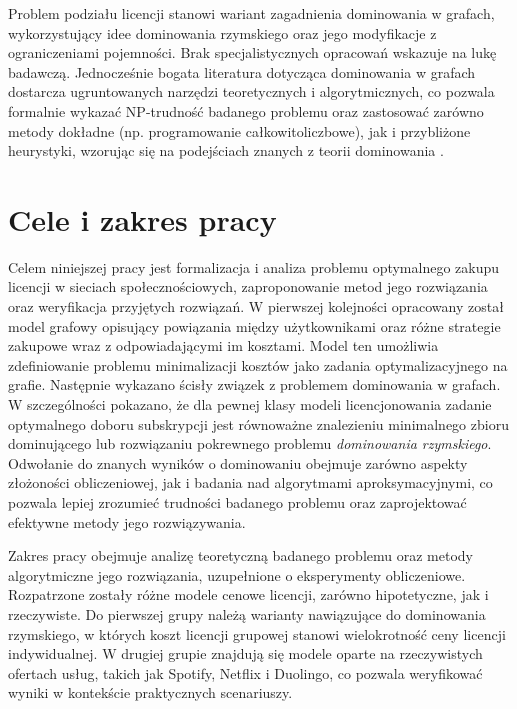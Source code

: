 Problem podziału licencji stanowi wariant zagadnienia dominowania w grafach, wykorzystujący idee dominowania rzymskiego oraz jego modyfikacje z ograniczeniami pojemności. Brak specjalistycznych opracowań wskazuje na lukę badawczą. Jednocześnie bogata literatura dotycząca dominowania w grafach dostarcza ugruntowanych narzędzi teoretycznych i algorytmicznych, co pozwala formalnie wykazać NP-trudność badanego problemu oraz zastosować zarówno metody dokładne (np. programowanie całkowitoliczbowe), jak i przybliżone heurystyki, wzorując się na podejściach znanych z teorii dominowania \cite{Roman2DominationSurvey, CapDom}.


\section{Cele i zakres pracy}
Celem niniejszej pracy jest formalizacja i analiza problemu optymalnego zakupu licencji w sieciach społecznościowych, zaproponowanie metod jego rozwiązania oraz weryfikacja przyjętych rozwiązań. W pierwszej kolejności opracowany został model grafowy opisujący powiązania między użytkownikami oraz różne strategie zakupowe wraz z odpowiadającymi im kosztami. Model ten umożliwia zdefiniowanie problemu minimalizacji kosztów jako zadania optymalizacyjnego na grafie. Następnie wykazano ścisły związek z problemem dominowania w grafach. W szczególności pokazano, że dla pewnej klasy modeli licencjonowania zadanie optymalnego doboru subskrypcji jest równoważne znalezieniu minimalnego zbioru dominującego lub rozwiązaniu pokrewnego problemu \emph{dominowania rzymskiego}. Odwołanie do znanych wyników o dominowaniu obejmuje zarówno aspekty złożoności obliczeniowej, jak i badania nad algorytmami aproksymacyjnymi, co pozwala lepiej zrozumieć trudności badanego problemu oraz zaprojektować efektywne metody jego rozwiązywania.

Zakres pracy obejmuje analizę teoretyczną badanego problemu oraz metody algorytmiczne jego rozwiązania, uzupełnione o eksperymenty obliczeniowe. Rozpatrzone zostały różne modele cenowe licencji, zarówno hipotetyczne, jak i rzeczywiste. Do pierwszej grupy należą warianty nawiązujące do dominowania rzymskiego, w których koszt licencji grupowej stanowi wielokrotność ceny licencji indywidualnej. W drugiej grupie znajdują się modele oparte na rzeczywistych ofertach usług, takich jak Spotify, Netflix i Duolingo, co pozwala weryfikować wyniki w kontekście praktycznych scenariuszy.


